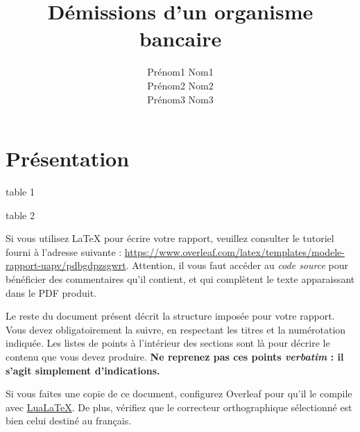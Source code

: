 \documentclass{ceri/sty/rapport}
\title{Démissions d’un organisme bancaire}
\author{
	Prénom1 Nom1 \\ %
	Prénom2 Nom2 \\
	Prénom3 Nom3
}
\begin{document}
 

\maketitle

\sloppy      













\section{Présentation}


table 1 \newline



\phantom{a}\newline

table 2 \newline



Si vous utilisez \LaTeX{} pour écrire votre rapport, veuillez consulter le tutoriel fourni à l'adresse suivante : \url{https://www.overleaf.com/latex/templates/modele-rapport-uapv/pdbgdpzsgwrt}. Attention, il vous faut accéder au \textit{code source} pour bénéficier des commentaires qu'il contient, et qui complètent le texte apparaissant dans le PDF produit.

Le reste du document présent décrit la structure imposée pour votre rapport. Vous devez obligatoirement la suivre, en respectant les titres et la numérotation indiquée. Les listes de points à l'intérieur des sections sont là pour décrire le contenu que vous devez produire. \textbf{Ne reprenez pas ces points \textit{verbatim} : il s'agit simplement d'indications.}

\begin{beware}[Remarque]
Si vous faites une copie de ce document, configurez Overleaf pour qu'il le compile avec \href{https://fr.wikipedia.org/wiki/LuaTeX}{LuaLaTeX}. De plus, vérifiez que le correcteur orthographique sélectionné est bien celui destiné au français.
\end{beware}
\end{document}
